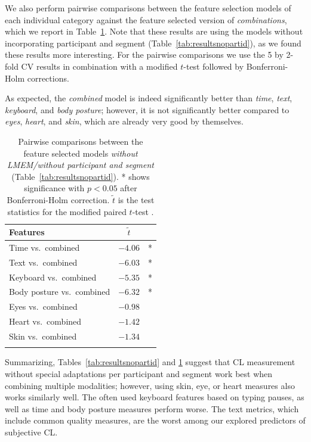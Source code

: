 \documentclass[output=paper]{langsci/langscibook}
\begin{document}
We also perform pairwise comparisons between the feature selection models of each individual category against the feature selected version of \textit{combinations}, which we report in Table~\ref{tab:pairwise}. Note that these results are using the models without incorporating participant and segment (Table~\ref{tab:resultsnopartid}), as we found these results more interesting. For the pairwise comparisons we use the 5 by 2-fold CV results in combination with a modified $t$-test \citep{dietterich1998approximate} followed by Bonferroni-Holm corrections.

As expected, the \textit{combined} model is indeed significantly better than \textit{time}, \textit{text}, \textit{keyboard}, and \textit{body posture}; however, it is not significantly better compared to \textit{eyes}, \textit{heart}, and \textit{skin}, which are already very good by themselves.

\begin{table}
\begin{tabular}{lr@{ }c}
\lsptoprule
Features & \multicolumn{1}{c}{$\tilde{t}$} & \\
\midrule
Time vs.\ combined & $-4.06$ & *\\
Text vs.\ combined & $-6.03$ & *\\
Keyboard vs.\ combined & $-5.35$ & *\\
Body posture vs.\ combined & $-6.32$ & *\\
\midrule
Eyes vs.\ combined & $-0.98$& \\
Heart vs.\ combined & $-1.42$& \\
Skin vs.\ combined & $-1.34$& \\
\lspbottomrule
\end{tabular}
\caption{Pairwise comparisons between the feature selected models \textit {without LMEM\slash without participant and segment} (Table~\ref{tab:resultsnopartid}). * shows significance with $p<0.05$ after Bonferroni-Holm correction. $\tilde{t}$ is the test statistics for the modified paired $t$-test \citep{dietterich1998approximate}.\label{tab:pairwise}}
\end{table}

Summarizing, Tables~\ref{tab:resultsnopartid} and \ref{tab:pairwise} suggest that CL measurement without special adaptations per participant and segment work best when combining multiple modalities; however, using skin, eye, or heart measures also works similarly well. The often used keyboard features based on typing pauses, as well as time and body posture measures perform worse. The text metrics, which include common quality measures, are the worst among our explored predictors of subjective CL.
\end{document}
